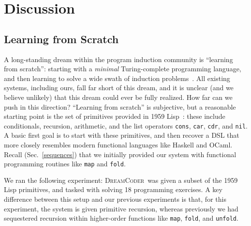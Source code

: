 \documentclass{article}
\newcommand{\system}{\textsc{DreamCoder}~}
\newcommand{\systemEnding}{\textsc{DreamCoder}}
\newcommand{\code}[1]{{\footnotesize\texttt{#1}}}
\begin{document}


\section{Discussion}

\subsection{Learning from Scratch}
A long-standing dream within the program induction community
is ``learning from scratch'': starting with a \emph{minimal} Turing-complete programming language,
and then learning to solve a wide swath of
induction problems~\cite{solomonoff1964formal,schmidhuber2004optimal,hutter2004universal,solomonoff1989system}.
All existing systems,
including ours,
fall far short of this dream,
and it is unclear (and we believe unlikely)
that this dream could ever be fully realized.
How far can we push in this direction?
``Learning from scratch'' is subjective, but a reasonable
starting point is the set of primitives provided in 1959
Lisp~\cite{mccarthy1960recursive}: these include
conditionals, recursion, arithmetic, and the 
list operators \code{cons}, \code{car}, \code{cdr}, and \code{nil}.
A  basic first goal is to start with
these primitives,
and then recover a DSL that
more closely resembles modern functional languages like Haskell and OCaml.
Recall (Sec.~\ref{sequences})
that we initially provided our system with functional programming routines like
\code{map} and \code{fold}.

We ran the following experiment: \system was given a subset of the
1959 Lisp primitives, and tasked with solving 18 programming
exercises. A key difference between this setup and our previous
experiments is that, for this experiment, the system is given
primitive recursion, whereas previously we had sequestered recursion
within higher-order functions like \code{map}, \code{fold}, and
\code{unfold}.
\end{document}
